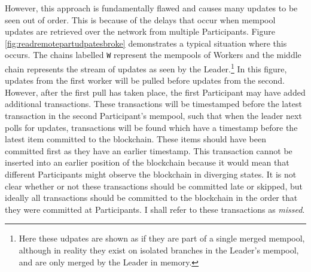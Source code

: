 \documentclass[12pt,a4paper,twoside,openright]{report}
\begin{document}
	However, this approach is fundamentally flawed and causes many updates to be seen out of order. 
	This is because of the delays that occur when mempool updates are retrieved over the network from multiple Participants.
	Figure \ref{fig:readremotepartudpatesbroke} demonstrates a typical situation where this occurs.
	The chains labelled \texttt{W} represent the mempools of Workers and the middle chain represents the stream of updates as seen by the Leader.\footnote{Here these udpates are shown as if they are part of a single merged mempool, although in reality they exist on isolated branches in the Leader's mempool, and are only merged by the Leader in memory.}
	In this figure, updates from the first worker will be pulled before updates from the second.
	However, after the first pull has taken place, the first Participant may have added additional transactions. 
	These transactions will be timestamped before the latest transaction in the second Participant's mempool, such that when the leader next polls for updates, transactions will be found which have a timestamp before the latest item committed to the blockchain.
	These items should have been committed first as they have an earlier timestamp.
	This transaction cannot be inserted into an earlier position of the blockchain because it would mean that different Participants might observe the blockchain in diverging states.
	It is not clear whether or not these transactions should be committed late or skipped, but ideally all transactions should be committed to the blockchain in the order that they were committed at Participants.
	I shall refer to these transactions as \textit{missed}.\\
\end{document}
